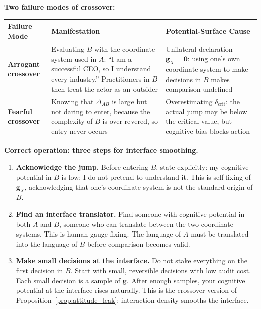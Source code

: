 \documentclass[12pt,a4paper]{article}
\theoremstyle{remark}
\begin{document}
\textbf{Two failure modes of crossover:}

\begin{center}
\begin{tabular}{p{3.5cm} p{5cm} p{6cm}}
\toprule
\textbf{Failure Mode} & \textbf{Manifestation} & \textbf{Potential-Surface Cause} \\
\midrule
\textbf{Arrogant crossover} & Evaluating $B$ with the coordinate system used in $A$: ``I am a successful CEO, so I understand every industry.'' Practitioners in $B$ then treat the actor as an outsider & Unilateral declaration $\mathbf{g}_X = \mathbf{0}$: using one's own coordinate system to make decisions in $B$ makes comparison undefined \\
\hline
\textbf{Fearful crossover} & Knowing that $\Delta_{AB}$ is large but not daring to enter, because the complexity of $B$ is over-revered, so entry never occurs & Overestimating $\delta_{\text{crit}}$: the actual jump may be below the critical value, but cognitive bias blocks action \\
\bottomrule
\end{tabular}
\end{center}

\textbf{Correct operation: three steps for interface smoothing.}

\begin{enumerate}[label=(\arabic*)]
    \item \textbf{Acknowledge the jump.} Before entering $B$, state explicitly: my cognitive potential in $B$ is low; I do not pretend to understand it. This is self-fixing of $\mathbf{g}_X$, acknowledging that one's coordinate system is not the standard origin of $B$.
    \item \textbf{Find an interface translator.} Find someone with cognitive potential in both $A$ and $B$, someone who can translate between the two coordinate systems. This is human gauge fixing. The language of $A$ must be translated into the language of $B$ before comparison becomes valid.
    \item \textbf{Make small decisions at the interface.} Do not stake everything on the first decision in $B$. Start with small, reversible decisions with low audit cost. Each small decision is a sample of $\mathbf{g}$. After enough samples, your cognitive potential at the interface rises naturally. This is the crossover version of Proposition~\ref{prop:attitude_leak}: interaction density smooths the interface.
\end{enumerate}
\end{document}
